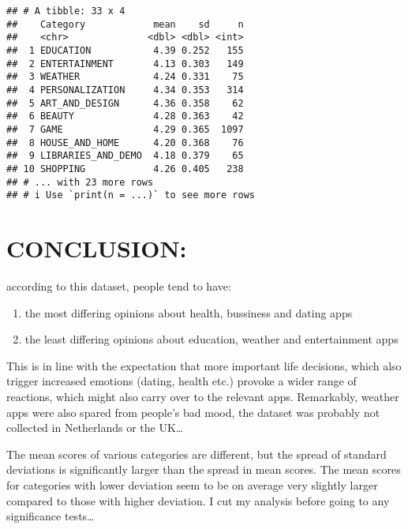 \documentclass[
]{article}
\begin{document}
\begin{verbatim}
## # A tibble: 33 x 4
##    Category            mean    sd     n
##    <chr>              <dbl> <dbl> <int>
##  1 EDUCATION           4.39 0.252   155
##  2 ENTERTAINMENT       4.13 0.303   149
##  3 WEATHER             4.24 0.331    75
##  4 PERSONALIZATION     4.34 0.353   314
##  5 ART_AND_DESIGN      4.36 0.358    62
##  6 BEAUTY              4.28 0.363    42
##  7 GAME                4.29 0.365  1097
##  8 HOUSE_AND_HOME      4.20 0.368    76
##  9 LIBRARIES_AND_DEMO  4.18 0.379    65
## 10 SHOPPING            4.26 0.405   238
## # ... with 23 more rows
## # i Use `print(n = ...)` to see more rows
\end{verbatim}

\hypertarget{conclusion}{%
\section{CONCLUSION:}\label{conclusion}}

according to this dataset, people tend to have:

\begin{enumerate}
\def\labelenumi{(\roman{enumi})}
\item
  the most differing opinions about health, bussiness and dating apps
\item
  the least differing opinions about education, weather and
  entertainment apps
\end{enumerate}

This is in line with the expectation that more important life decisions,
which also trigger increased emotions (dating, health etc.) provoke a
wider range of reactions, which might also carry over to the relevant
apps. Remarkably, weather apps were also spared from people's bad mood,
the dataset was probably not collected in Netherlands or the UK\ldots{}

The mean scores of various categories are different, but the spread of
standard deviations is significantly larger than the spread in mean
scores. The mean scores for categories with lower deviation seem to be
on average very slightly larger compared to those with higher deviation.
I cut my analysis before going to any significance tests\ldots{}
\end{document}
